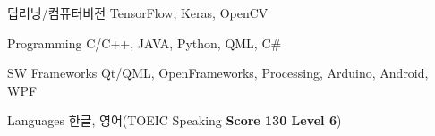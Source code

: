 


\begin{cvskills}

  \cvskill
    {딥러닝/컴퓨터비전} %
    {TensorFlow, Keras, OpenCV} %

  \cvskill
    {Programming} %
    {C/C++, JAVA, Python, QML, C\#} %

  \cvskill
    {SW Frameworks} %
    {Qt/QML, OpenFrameworks, Processing, Arduino, Android, WPF} %

  \cvskill
    {Languages} %
    {한글, 영어(TOEIC Speaking \textbf{Score 130 Level 6})} %

\end{cvskills}
